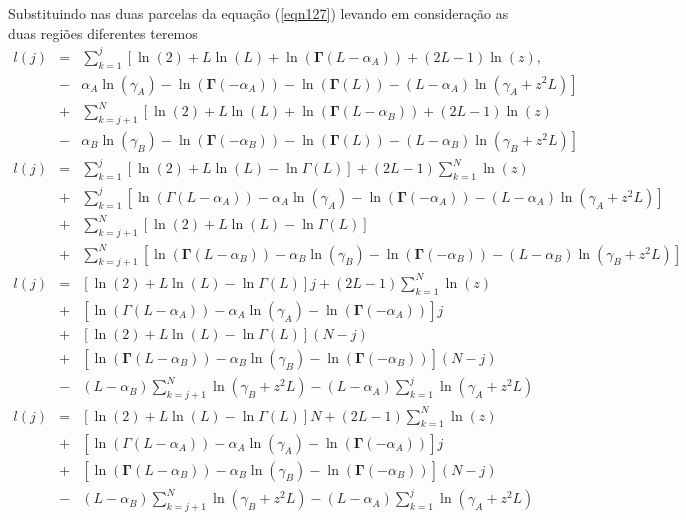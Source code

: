 Substituindo nas duas parcelas da equação (\ref{eqn127}) levando em consideração as duas regiões diferentes teremos
\begin{equation*}
\begin{array}{rcl}
	l(j)&=&\sum_{k=1}^{j}\left[\ln{(2)}+L\ln{(L)}+\ln{(\mathbf{\Gamma}(L-\alpha_{A}))}+(2L-1)\ln{(z)}\right., \\
	&-&\left.\alpha_{A}\ln{(\gamma_{A})} -\ln{(\mathbf{\Gamma}(-\alpha_{A}))}-\ln{(\mathbf{\Gamma}(L))}-(L-\alpha_{A})\ln{(\gamma_{A}+z^2L)}\right]\\
	&+&\sum_{k=j+1}^{N}\left[ \ln{(2)}+L\ln{(L)}+\ln{(\mathbf{\Gamma}(L-\alpha_{B}))}+(2L-1)\ln{(z)}\right. \\
	&-&\left.\alpha_{B}\ln{(\gamma_{B})} -\ln{(\mathbf{\Gamma}(-\alpha_{B}))}-\ln{(\mathbf{\Gamma}(L))}-(L-\alpha_{B})\ln{(\gamma_{B}+z^2L)}\right]\\
	l(j)&=&\sum_{k=1}^{j}\left[\ln{(2)}+L\ln{(L)}-\ln{\Gamma(L)}\right]+(2L-1)\sum_{k=1}^{N}\ln{(z)} \\
	&+&\sum_{k=1}^{j}\left[\ln{(\Gamma(L-\alpha_{A}))}-\alpha_{A}\ln{(\gamma_{A})} -\ln{(\mathbf{\Gamma}(-\alpha_{A}))}-(L-\alpha_{A})\ln{(\gamma_{A}+z^2L)}\right]\\
	&+&\sum_{k=j+1}^{N}\left[\ln{(2)}+L\ln{(L)}-\ln{\Gamma(L)}\right] \\
	&+&\sum_{k=j+1}^{N}\left[\ln{(\mathbf{\Gamma}(L-\alpha_{B}))}-\alpha_{B}\ln{(\gamma_{B})} -\ln{(\mathbf{\Gamma}(-\alpha_{B}))}-(L-\alpha_{B})\ln{(\gamma_{B}+z^2L)}\right]\\
	l(j)&=&\left[\ln{(2)}+L\ln{(L)}-\ln{\Gamma(L)}\right]j+(2L-1)\sum_{k=1}^{N}\ln{(z)} \\
	&+&\left[\ln{(\Gamma(L-\alpha_{A}))}-\alpha_{A}\ln{(\gamma_{A})} -\ln{(\mathbf{\Gamma}(-\alpha_{A}))}\right]j\\
	  &+&\left[\ln{(2)}+L\ln{(L)}-\ln{\Gamma(L)}\right](N-j) \\
	&+&\left[\ln{(\mathbf{\Gamma}(L-\alpha_{B}))}-\alpha_{B}\ln{(\gamma_{B})} -\ln{(\mathbf{\Gamma}(-\alpha_{B}))}\right](N-j) \\
	&-&(L-\alpha_{B})\sum_{k=j+1}^{N}\ln{(\gamma_{B}+z^2L)}-(L-\alpha_{A})\sum_{k=1}^{j}\ln{(\gamma_{A}+z^2L)}\\
	l(j)&=&\left[\ln{(2)}+L\ln{(L)}-\ln{\Gamma(L)}\right]N+(2L-1)\sum_{k=1}^{N}\ln{(z)} \\
	&+&\left[\ln{(\Gamma(L-\alpha_{A}))}-\alpha_{A}\ln{(\gamma_{A})} -\ln{(\mathbf{\Gamma}(-\alpha_{A}))}\right]j\\
	&+&\left[\ln{(\mathbf{\Gamma}(L-\alpha_{B}))}-\alpha_{B}\ln{(\gamma_{B})} -\ln{(\mathbf{\Gamma}(-\alpha_{B}))}\right](N-j) \\
	&-&(L-\alpha_{B})\sum_{k=j+1}^{N}\ln{(\gamma_{B}+z^2L)}-(L-\alpha_{A})\sum_{k=1}^{j}\ln{(\gamma_{A}+z^2L)}\\
\end{array}
\end{equation*}

